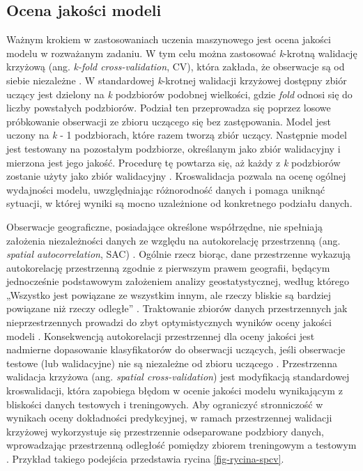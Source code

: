 \documentclass{amuthesis}
\begin{document}
\hypertarget{sec-model-quality-assessment}{%
\subsection{Ocena jakości modeli}\label{sec-model-quality-assessment}}

Ważnym krokiem w zastosowaniach uczenia maszynowego jest ocena jakości
modelu w rozważanym zadaniu. W tym celu można zastosować \emph{k}-krotną
walidację krzyżową (ang. \emph{k-fold cross-validation}, CV), która
zakłada, że obserwacje są od siebie niezależne
\autocite{pohjankukka_2017_scv}. W standardowej \emph{k}-krotnej
walidacji krzyżowej dostępny zbiór uczący jest dzielony na \emph{k}
podzbiorów podobnej wielkości, gdzie \emph{fold} odnosi się do liczby
powstałych podzbiorów. Podział ten przeprowadza się poprzez losowe
próbkowanie obserwacji ze zbioru uczącego się bez zastępowania. Model
jest uczony na \emph{k} - 1 podzbiorach, które razem tworzą zbiór
uczący. Następnie model jest testowany na pozostałym podzbiorze,
określanym jako zbiór walidacyjny i mierzona jest jego jakość. Procedurę
tę powtarza się, aż każdy z \emph{k} podzbiorów zostanie użyty jako
zbiór walidacyjny \autocite{berrar_2018_cv}. Kroswalidacja pozwala na
ocenę ogólnej wydajności modelu, uwzględniając różnorodność danych i
pomaga uniknąć sytuacji, w której wyniki są mocno uzależnione od
konkretnego podziału danych.

Obserwacje geograficzne, posiadające określone współrzędne, nie
spełniają założenia niezależności danych ze względu na autokorelację
przestrzenną (ang. \emph{spatial autocorrelation}, SAC)
\autocite{pohjankukka_2017_scv}. Ogólnie rzecz biorąc, dane przestrzenne
wykazują autokorelację przestrzenną zgodnie z pierwszym prawem
geografii, będącym jednocześnie podstawowym założeniem analizy
geostatystycznej, według którego „Wszystko jest powiązane ze wszystkim
innym, ale rzeczy bliskie są bardziej powiązane niż rzeczy odległe''
\autocite{tobler_1970_first_law_of_geography}. Traktowanie zbiorów
danych przestrzennych jak nieprzestrzennych prowadzi do zbyt
optymistycznych wyników oceny jakości modeli
\autocite{brenning_2005_scv}. Konsekwencją autokorelacji przestrzennej
dla oceny jakości jest nadmierne dopasowanie klasyfikatorów do
obserwacji uczących, jeśli obserwacje testowe (lub walidacyjne) nie są
niezależne od zbioru uczącego \autocite{brenning_2012_scv}. Przestrzenna
walidacja krzyżowa (ang. \emph{spatial cross-validation}) jest
modyfikacją standardowej kroswalidacji, która zapobiega błędom w ocenie
jakości modelu wynikającym z bliskości danych testowych i treningowych.
Aby ograniczyć stronniczość w wynikach oceny dokładności predykcyjnej, w
ramach przestrzennej walidacji krzyżowej wykorzystuje się przestrzennie
odseparowane podzbiory danych, wprowadzając przestrzenną odległość
pomiędzy zbiorem treningowym a testowym \autocite{pohjankukka_2017_scv}.
Przykład takiego podejścia przedstawia rycina \ref{fig-rycina-spcv}.
\end{document}
